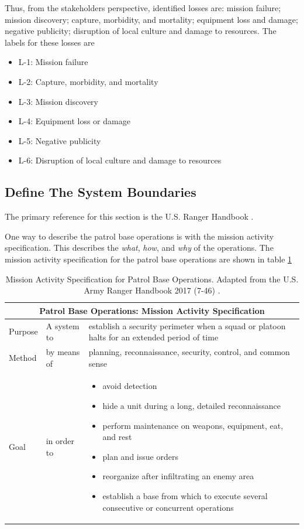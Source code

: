 \documentclass[../../main/main.tex]{subfiles}
\begin{document}
Thus, from the stakeholders perspective, identified losses are: mission failure; mission discovery; capture, morbidity, and mortality; equipment loss and damage; negative publicity; disruption of local culture and damage to resources.  The labels for these losses are 

\begin{itemize}
\item L-1: Mission failure
\item L-2: Capture, morbidity, and mortality
\item L-3: Mission discovery
\item L-4: Equipment loss or damage
\item L-5: Negative publicity
\item L-6: Disruption of local culture and damage to resources
\end{itemize}

\subsection{Define The System Boundaries}
The primary reference for this section is the U.S. Ranger Handbook \cite{rangermanual}.

One way to describe the patrol base operations is with the mission activity specification.  This describes the \textit{what}, \textit{how}, and \textit{why} of the operations. The mission activity specification for the patrol base operations are shown in table \ref{pbtab}

\parskip=8pt
\begin{table}[h!]
\begin{center}
\begin{tabular}{ | m{3.3em} | m{3.8cm}| m{9cm} | } 
\hline
\multicolumn{3}{|c|}{Patrol Base Operations: Mission Activity Specification} \\
\hline \hline
Purpose & A system to & establish a security perimeter when a squad or platoon halts for an extended period of time \\ 
\hline
Method & by means of  & planning, reconnaissance, security, control, and common sense  \\ 
\hline
Goal & in order to & 
\begin{itemize}
\item avoid detection
\item hide a unit during a long, detailed reconnaissance
\item perform maintenance on weapons, equipment, eat, and rest
\item plan and issue orders
\item reorganize after infiltrating an enemy area
\item establish a base from which to execute several consecutive or concurrent operations
\end{itemize}
\\ 
\hline
\end{tabular}
\end{center}
\caption{Mission Activity Specification for Patrol Base Operations.  Adapted from the U.S. Army Ranger Handbook 2017 (7-46) \cite{rangermanual}.}
\label{pbtab}
\end{table}
\parskip=18pt
\end{document}

